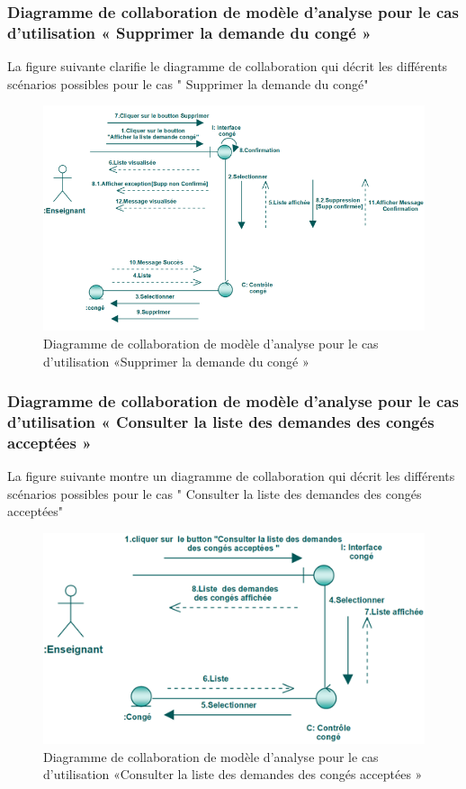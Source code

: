 \documentclass[12 pt ]{report}
\begin{document}
\subsubsection{Diagramme  de  collaboration  de  modèle  d'analyse  pour  le  cas  d'utilisation « Supprimer  la demande du  congé »  }
La figure suivante clarifie le diagramme de collaboration qui décrit les différents
scénarios possibles pour le cas " Supprimer  la demande du  congé"
\begin{figure}[h]
\begin{center}
\includegraphics[width= 12cm , height =6 cm]{colla_ens_supprimerdemandeconge.png}
 \caption{Diagramme  de  collaboration  de  modèle  d'analyse  pour  le  cas  d'utilisation «Supprimer  la demande du congé »}
\end{center}
\end{figure}
\subsubsection{Diagramme  de  collaboration  de  modèle  d'analyse  pour  le  cas  d'utilisation « Consulter la liste des demandes 
 des congés acceptées »  }
La figure suivante montre un diagramme de collaboration qui décrit les différents
scénarios possibles pour le cas " Consulter la liste des demandes 
 des congés acceptées"
\begin{figure}[h]
\begin{center}
\includegraphics[width= 14cm , height =5 cm]{collaconscon.PNG}
 \caption{Diagramme  de  collaboration  de  modèle  d'analyse  pour  le  cas  d'utilisation «Consulter la liste des demandes 
 des congés acceptées »}
\end{center}
\end{figure}
\end{document}
